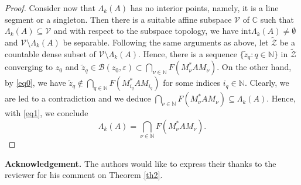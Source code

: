 \documentclass[12pt, reqno]{amsart}
\theoremstyle{definition}
\theoremstyle{remark}
\numberwithin{equation}{section}
\begin{document}
\begin{proof}
Consider now that $\Lambda_{k}(A)$ has no interior points, namely, it is a line segment or a singleton.
Then there is a suitable affine subspace $\mathcal{V}$ of $\mathbb{C}$ such that $\Lambda_{k}(A)\subseteq\mathcal{V}$ and with respect to the subspace topology, we have $\mathrm{int}\Lambda_{k}(A)\neq\emptyset$ and $\mathcal{V}\setminus\Lambda_{k}(A)$ be separable.
Following the same arguments as above, let $\widetilde{\mathcal{Z}}$ be a countable dense subset of $\mathcal{V}\setminus\Lambda_{k}(A)$. Hence, there is a sequence $\{\widetilde{z}_{q}: q\in\mathbb{N}\}$ in $\widetilde{\mathcal{Z}}$ converging to $z_{0}$ and  $\widetilde{z}_{q}\in\mathcal{B}(z_{0},\varepsilon)\subset
\bigcap_{\nu\in\mathbb{N}}F(M_{\nu}^{*}AM_{\nu})$. On the other hand, by \eqref{eq0}, we have $\widetilde{z}_{q}\notin \bigcap_{q\in\mathbb{N}}F(M_{i_{q}}^{*}AM_{i_{q}})$ for some indices $i_{q}\in\mathbb{N}$.
Clearly, we are led to a contradiction and we deduce $\bigcap_{\nu\in\mathbb{N}}F(M_{\nu}^{*}AM_{\nu})\subseteq\Lambda_{k}(A)$. Hence, with \eqref{eq1}, we conclude
\[
\Lambda_{k}(A)=\bigcap_{\nu\in\mathbb{N}}F(M_{\nu}^{*}AM_{\nu}).
\]
\end{proof}
{\bf Acknowledgement.} The authors would like to express their thanks to the reviewer for his comment on Theorem \ref{th2}.
\end{document}
